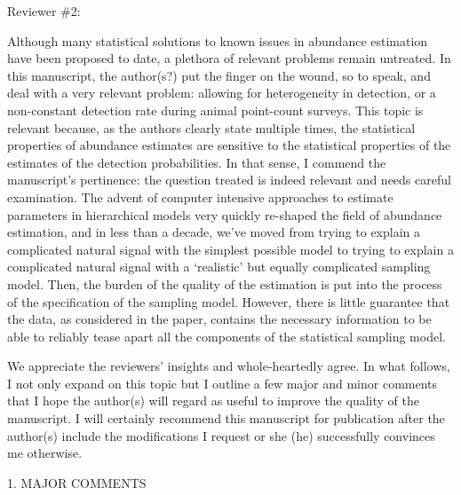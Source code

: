 \documentclass[12pt]{article}
\renewenvironment{quote}  %
              {\list{}{\rightmargin\leftmargin}\normalfont%
               \item\relax}
              {\endlist}
\begin{document}
\newpage



Reviewer \#2:

Although many statistical solutions to known issues in abundance estimation have been proposed to date, a plethora of relevant problems remain untreated.  In this manuscript, the author(s?) put the finger on the wound, so to speak, and deal with a very relevant problem: allowing for heterogeneity in detection, or a non-constant detection rate during animal point-count surveys.  This topic is relevant because, as the authors clearly state multiple times, the statistical properties of abundance estimates are sensitive to the statistical properties of the estimates of the detection probabilities. In that sense, I commend the manuscript's pertinence: the question treated is indeed relevant and needs careful examination.
The advent of computer intensive approaches to estimate parameters in hierarchical models very quickly re-shaped the field of abundance estimation, and in less than a decade, we've moved from trying to explain a complicated natural signal with the simplest possible model to trying to explain a complicated natural signal with a `realistic' but equally complicated sampling model. Then, the burden of the quality of the estimation is put into the process of the specification of the sampling model. However, there is little guarantee that the data, as considered in the paper, contains the necessary information to be able to reliably tease apart all the components of the statistical sampling model. 
\begin{quote}
We appreciate the reviewers' insights and whole-heartedly agree.
\end{quote}
In what follows, I not only expand on this topic but I outline a few major and minor comments that I hope the author(s) will regard as useful to improve the quality of the manuscript. I will certainly recommend this manuscript for publication after the author(s) include the
modifications I request or she (he) successfully convinces me otherwise.



1. MAJOR COMMENTS
\end{document}
